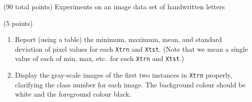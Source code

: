 \documentclass[12pt]{article}
\begin{document}
\clearpage
%
% 
\newcommand{\qTwoTitle}{Experiments on an image data set of handwritten letters}
%

  \begin{question}{(90 total points) \qTwoTitle}



%
%
\medskip
\begin{subquestion}{(5 points)
  } \label{q2.1}
  \begin{enumerate}\NARROWITEM
  \item Report (using a table) the minimum, maximum, mean, and standard deviation of pixel values for each {\tt Xtrn} and {\tt Xtst}.
    (Note that we mean a single value of each of min, max, etc.\ for each {\tt Xtrn} and {\tt Xtst}.)
  \item Display the gray-scale images of the first two instances in {\tt Xtrn} properly, clarifying the class number for each image.
    The background colour should be white and the foreground colour black.
  \end{enumerate}
   


\end{subquestion}
\end{question}
\end{document}
